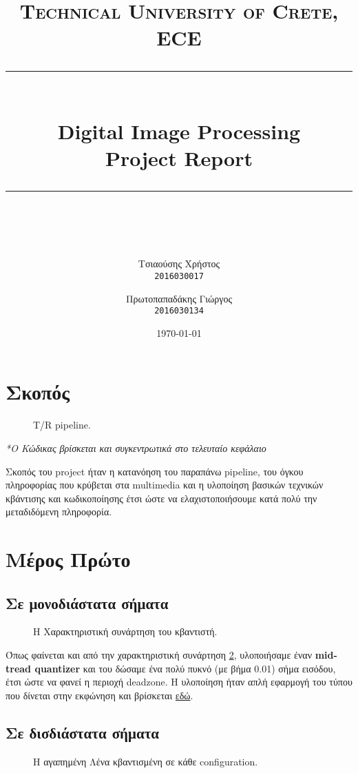 \documentclass[11pt]{scrartcl} %
\title{
	\normalfont\normalsize
	\textsc{Technical University of Crete, ECE}\\ %
	\vspace{25pt} %
	\rule{\linewidth}{0.5pt}\\ %
	\vspace{20pt} %
	{\Huge Digital Image Processing}\\ %

	{\huge Project Report}\\ %
	\vspace{12pt} %
	\rule{\linewidth}{2pt}\\ %
	\vspace{12pt} %
}
\author{\LARGE{Τσιαούσης Χρήστος}\\
		\texttt{2016030017}
		\and
		\LARGE{Πρωτοπαπαδάκης Γιώργος}\\
		\texttt{2016030134}}%
\date{\normalsize\today} %
\begin{document}
\maketitle %

\section{Σκοπός}

\begin{figure}[h]
    \centering
    \caption{T/R pipeline.}
    \label{fig:1}
\end{figure}

\textit{*Ο Κώδικας βρίσκεται και συγκεντρωτικά στο τελευταίο κεφάλαιο}

\clearpage
Σκοπός του project ήταν η κατανόηση του παραπάνω pipeline, του όγκου πληροφορίας που κρύβεται στα multimedia και η υλοποίηση βασικών τεχνικών κβάντισης και κωδικοποίησης
έτσι ώστε να ελαχιστοποιήσουμε κατά πολύ την μεταδιδόμενη πληροφορία.

\section{Μέρος Πρώτο}

\subsection{Σε μονοδιάστατα σήματα}
\begin{figure}[h]
    \centering
    \caption{Η Χαρακτηριστική συνάρτηση του κβαντιστή.}
    \label{quant1d}
\end{figure}

Όπως φαίνεται και από την χαρακτηριστική συνάρτηση \ref{quant1d}, υλοποιήσαμε έναν \textbf{mid-tread quantizer} και του δώσαμε ένα πολύ πυκνό (με βήμα 0.01) σήμα
εισόδου, έτσι ώστε να φανεί η περιοχή deadzone. Η υλοποίηση ήταν απλή εφαρμογή του τύπου που δίνεται στην εκφώνηση και βρίσκεται \hyperlink{uni_scalar}{εδώ}.


\subsection{Σε δισδιάστατα σήματα}
\begin{figure}[h]
    \centering
    \caption{Η αγαπημένη Λένα κβαντισμένη σε κάθε configuration.}
    \label{quant2d}
\end{figure}
\end{document}
